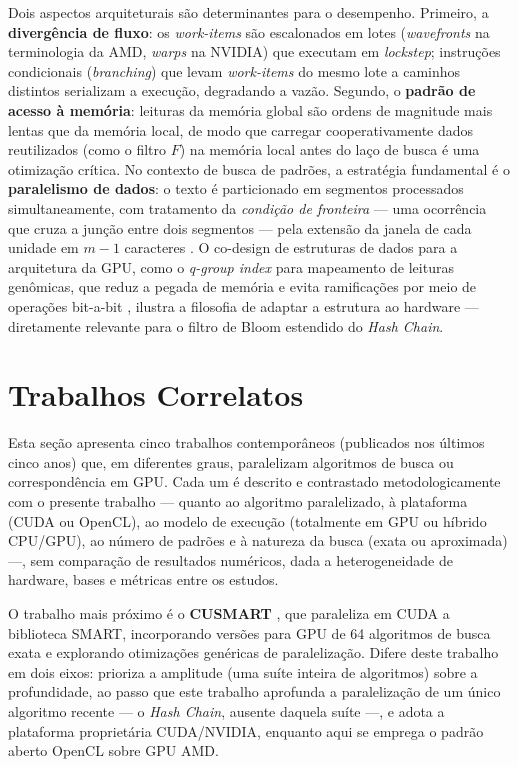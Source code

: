 \documentclass[12pt]{article}
\begin{document}
Dois aspectos arquiteturais são determinantes para o desempenho. Primeiro, a \textbf{divergência de fluxo}: os \textit{work-items} são escalonados em lotes (\textit{wavefronts} na terminologia da AMD, \textit{warps} na NVIDIA) que executam em \textit{lockstep}; instruções condicionais (\textit{branching}) que levam \textit{work-items} do mesmo lote a caminhos distintos serializam a execução, degradando a vazão. Segundo, o \textbf{padrão de acesso à memória}: leituras da memória global são ordens de magnitude mais lentas que da memória local, de modo que carregar cooperativamente dados reutilizados (como o filtro $F$) na memória local antes do laço de busca é uma otimização crítica. No contexto de busca de padrões, a estratégia fundamental é o \textbf{paralelismo de dados}: o texto é particionado em segmentos processados simultaneamente, com tratamento da \textit{condição de fronteira} — uma ocorrência que cruza a junção entre dois segmentos — pela extensão da janela de cada unidade em $m-1$ caracteres \cite{ashkiani2016}. O co-design de estruturas de dados para a arquitetura da GPU, como o \textit{q-group index} para mapeamento de leituras genômicas, que reduz a pegada de memória e evita ramificações por meio de operações bit-a-bit \cite{koster2014}, ilustra a filosofia de adaptar a estrutura ao hardware — diretamente relevante para o filtro de Bloom estendido do \textit{Hash Chain}.

\section{Trabalhos Correlatos}

Esta seção apresenta cinco trabalhos contemporâneos (publicados nos últimos cinco anos) que, em diferentes graus, paralelizam algoritmos de busca ou correspondência em GPU. Cada um é descrito e contrastado metodologicamente com o presente trabalho — quanto ao algoritmo paralelizado, à plataforma (CUDA ou OpenCL), ao modelo de execução (totalmente em GPU ou híbrido CPU/GPU), ao número de padrões e à natureza da busca (exata ou aproximada) —, sem comparação de resultados numéricos, dada a heterogeneidade de hardware, bases e métricas entre os estudos.

O trabalho mais próximo é o \textbf{CUSMART} \cite{ozsoy2025}, que paraleliza em CUDA a biblioteca SMART, incorporando versões para GPU de 64 algoritmos de busca exata e explorando otimizações genéricas de paralelização. Difere deste trabalho em dois eixos: prioriza a amplitude (uma suíte inteira de algoritmos) sobre a profundidade, ao passo que este trabalho aprofunda a paralelização de um único algoritmo recente — o \textit{Hash Chain}, ausente daquela suíte —, e adota a plataforma proprietária CUDA/NVIDIA, enquanto aqui se emprega o padrão aberto OpenCL sobre GPU AMD.
\end{document}
